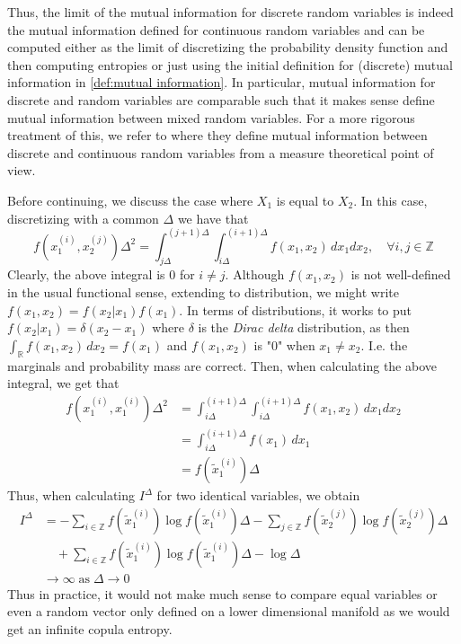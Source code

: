 \documentclass[../Thesis.tex]{subfiles}
\begin{document}
Thus, the limit of the mutual information for discrete random variables is indeed the mutual information defined for continuous random variables and can be computed either as the limit of discretizing the probability density function and then computing entropies or just using the initial definition for (discrete) mutual information in \autoref{def:mutual information}. In particular, mutual information for discrete and random variables are comparable such that it makes sense define mutual information between mixed random variables. For a more rigorous treatment of this, we refer to \cite{Estimating_Mutual_Information_for_Discrete-Continuous_Mixtures} where they define mutual information between discrete and continuous random variables from a measure theoretical point of view.


Before continuing, we discuss the case where $X_1$ is equal to $X_2$. In this case, discretizing with a common $\Delta$ we have that
$$f\left(x_1^{(i)}, x_2^{(j)}\right)\Delta^2 = \int_{j\Delta}^{(j+1)\Delta}\int_{i\Delta}^{(i+1)\Delta} f(x_1,x_2) \, dx_1 dx_2,\quad \forall i,j\in\mathbb{Z}$$
Clearly, the above integral is $0$ for $i\neq j$. Although $f(x_1,x_2)$ is not well-defined in the usual functional sense, extending to distribution, we might write $f(x_1,x_2) = f(x_2 | x_1) f(x_1)$. In terms of distributions, it works to put $f(x_2 | x_1) = \delta(x_2 - x_1)$ where $\delta$ is the \textit{Dirac delta} distribution, as then $\int_{\mathbb{R}} f(x_1,x_2) \, dx_2 = f(x_1)$ and $f(x_1, x_2)$ is "$0$" when $x_1 \neq x_2$. I.e. the marginals and probability mass are correct. Then, when calculating the above integral, we get that
\begin{align*}
    f\left(x_1^{(i)}, x_1^{(i)}\right)\Delta^2 & = \int_{i\Delta}^{(i+1)\Delta}\int_{i\Delta}^{(i+1)\Delta} f(x_1,x_2) \, dx_1 dx_2 \\
                                               & = \int_{i\Delta}^{(i+1)\Delta} f\left(x_1\right)\, dx_1                            \\
                                               & = f\left(\tilde{x}_1^{(i)}\right)\Delta
\end{align*}
Thus, when calculating $I^{\Delta}$ for two identical variables, we obtain
\begin{align*}
    I^{\Delta} & = -\sum_{i\in\mathbb{Z}} f\left(\tilde{x}_1^{(i)}\right) \log{f\left(\tilde{x}_1^{(i)}\right)}\Delta - \sum_{j\in\mathbb{Z}} f\left(\tilde{x}_2^{(j)}\right)  \log{f\left(\tilde{x}_2^{(j)}\right)}\Delta \\
               & \quad + \sum_{i\in\mathbb{Z}} f\left(\tilde{x}_1^{(i)}\right) \log{f\left(\tilde{x}_1^{(i)}\right)}\Delta - \log \Delta                                                                                   \\
               & \to \infty \;\text{as}\; \Delta \to 0
\end{align*}
Thus in practice, it would not make much sense to compare equal variables or even a random vector only defined on a lower dimensional manifold as we would get an infinite copula entropy.
\end{document}
